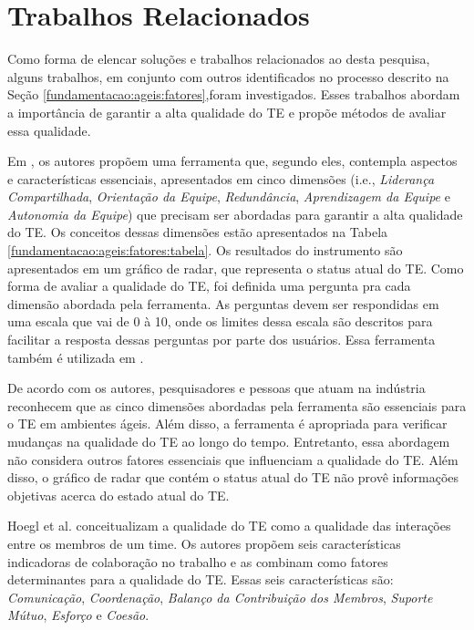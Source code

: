\chapter{Trabalhos Relacionados}
\label{trabalhos}

Como forma de elencar soluções e trabalhos relacionados ao desta pesquisa, alguns trabalhos, em conjunto com outros identificados no processo descrito na Seção \ref{fundamentacao:ageis:fatores},foram investigados. Esses trabalhos abordam a importância de garantir a alta qualidade do TE e propõe métodos de avaliar essa qualidade.

Em \cite{moe}, os autores propõem uma ferramenta que, segundo eles, contempla aspectos e características essenciais, apresentados em cinco dimensões (i.e., \textit{Liderança Compartilhada}, \textit{Orientação da Equipe}, \textit{Redundância}, \textit{Aprendizagem da Equipe} e \textit{Autonomia da Equipe}) que precisam ser abordadas para garantir a alta qualidade do TE. Os conceitos dessas dimensões estão apresentados na Tabela \ref{fundamentacao:ageis:fatores:tabela}. Os resultados do instrumento são apresentados em um gráfico de radar, que representa o status atual do TE. Como forma de avaliar a qualidade do TE, foi definida uma pergunta pra cada dimensão abordada pela ferramenta. As perguntas devem ser respondidas em uma escala que vai de 0 à 10, onde os limites dessa escala são descritos para facilitar a resposta dessas perguntas por parte dos usuários. Essa ferramenta também é utilizada em \cite{ringstad}.

De acordo com os autores, pesquisadores e pessoas que atuam na indústria reconhecem que as cinco dimensões abordadas pela ferramenta são essenciais para o TE em ambientes ágeis. Além disso, a ferramenta é apropriada para verificar mudanças na qualidade do TE ao longo do tempo. Entretanto, essa abordagem não considera outros fatores essenciais que influenciam a qualidade do TE. Além disso, o gráfico de radar que contém o status atual do TE não provê informações objetivas acerca do estado atual do TE.

Hoegl et al. \cite{hoegl} conceitualizam a qualidade do TE como a qualidade das interações entre os membros de um time. Os autores propõem seis características indicadoras de colaboração no trabalho e as combinam como fatores determinantes para a qualidade do TE. Essas seis características são: \textit{Comunicação}, \textit{Coordenação}, \textit{Balanço da Contribuição dos Membros}, \textit{Suporte Mútuo}, \textit{Esforço} e \textit{Coesão}.

